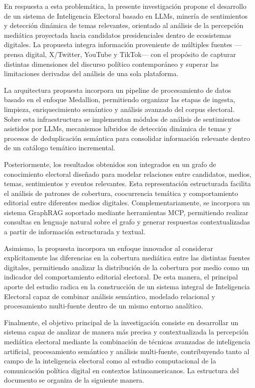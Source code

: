 En respuesta a esta problemática, la presente investigación propone el desarrollo de un sistema de Inteligencia Electoral basado en LLMs, minería de sentimientos y detección dinámica de temas relevantes, orientado al análisis de la percepción mediática proyectada hacia candidatos presidenciales dentro de ecosistemas digitales. La propuesta integra información proveniente de múltiples fuentes —prensa digital, X/Twitter, YouTube y TikTok— con el propósito de capturar distintas dimensiones del discurso político contemporáneo y superar las limitaciones derivadas del análisis de una sola plataforma.

La arquitectura propuesta incorpora un pipeline de procesamiento de datos basado en el enfoque Medallion, permitiendo organizar las etapas de ingesta, limpieza, enriquecimiento semántico y análisis avanzado del corpus electoral. Sobre esta infraestructura se implementan módulos de análisis de sentimientos asistidos por LLMs, mecanismos híbridos de detección dinámica de temas y procesos de deduplicación semántica para consolidar información relevante dentro de un catálogo temático incremental.

Posteriormente, los resultados obtenidos son integrados en un grafo de conocimiento electoral diseñado para modelar relaciones entre candidatos, medios, temas, sentimientos y eventos relevantes. Esta representación estructurada facilita el análisis de patrones de cobertura, coocurrencia temática y comportamiento editorial entre diferentes medios digitales. Complementariamente, se incorpora un sistema GraphRAG soportado mediante herramientas MCP, permitiendo realizar consultas en lenguaje natural sobre el grafo y generar respuestas contextualizadas a partir de información estructurada y textual.

Asimismo, la propuesta incorpora un enfoque innovador al considerar explícitamente las diferencias en la cobertura mediática entre las distintas fuentes digitales, permitiendo analizar la distribución de la cobertura por medio como un indicador del comportamiento editorial electoral. De esta manera, el principal aporte del estudio radica en la construcción de un sistema integral de Inteligencia Electoral capaz de combinar análisis semántico, modelado relacional y procesamiento multi-fuente dentro de un mismo entorno analítico.

Finalmente, el objetivo principal de la investigación consiste en desarrollar un sistema capaz de analizar de manera más precisa y contextualizada la percepción mediática electoral mediante la combinación de técnicas avanzadas de inteligencia artificial, procesamiento semántico y análisis multi-fuente, contribuyendo tanto al campo de la inteligencia electoral como al estudio computacional de la comunicación política digital en contextos latinoamericanos. La estructura del documento se organiza de la siguiente manera.

